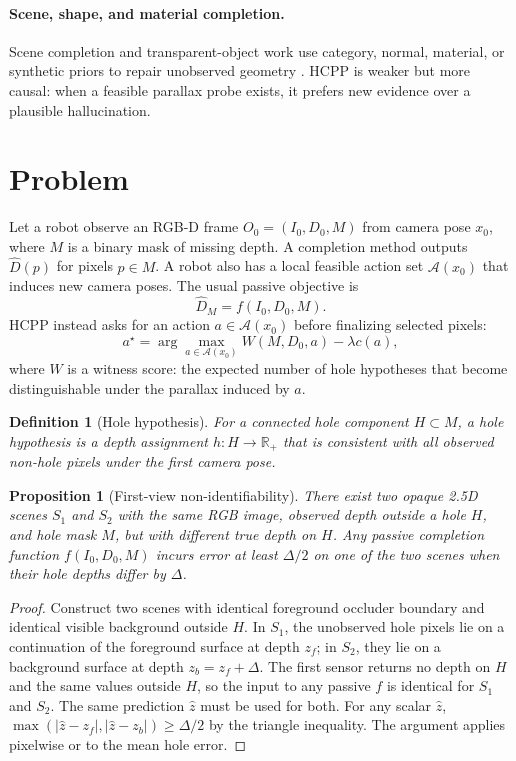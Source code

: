 \documentclass{article}
\newtheorem{proposition}{Proposition}
\newtheorem{definition}{Definition}
\begin{document}
\paragraph{Scene, shape, and material completion.}
Scene completion and transparent-object work use category, normal, material, or synthetic priors to repair unobserved geometry \citep{song2017sscnet,sajjan2019cleargrasp}. HCPP is weaker but more causal: when a feasible parallax probe exists, it prefers new evidence over a plausible hallucination.

\section{Problem}
Let a robot observe an RGB-D frame $O_0=(I_0,D_0,M)$ from camera pose $x_0$, where $M$ is a binary mask of missing depth. A completion method outputs $\hat{D}(p)$ for pixels $p\in M$. A robot also has a local feasible action set $\mathcal{A}(x_0)$ that induces new camera poses. The usual passive objective is
\begin{equation}
\hat{D}_M = f(I_0,D_0,M).
\end{equation}
HCPP instead asks for an action $a\in\mathcal{A}(x_0)$ before finalizing selected pixels:
\begin{equation}
a^\star = \arg\max_{a\in\mathcal{A}(x_0)} W(M,D_0,a) - \lambda c(a),
\end{equation}
where $W$ is a witness score: the expected number of hole hypotheses that become distinguishable under the parallax induced by $a$.

\begin{definition}[Hole hypothesis]
For a connected hole component $H\subset M$, a hole hypothesis is a depth assignment $h:H\rightarrow\mathbb{R}_+$ that is consistent with all observed non-hole pixels under the first camera pose.
\end{definition}

\begin{proposition}[First-view non-identifiability]
There exist two opaque 2.5D scenes $S_1$ and $S_2$ with the same RGB image, observed depth outside a hole $H$, and hole mask $M$, but with different true depth on $H$. Any passive completion function $f(I_0,D_0,M)$ incurs error at least $\Delta/2$ on one of the two scenes when their hole depths differ by $\Delta$.
\end{proposition}
\begin{proof}
Construct two scenes with identical foreground occluder boundary and identical visible background outside $H$. In $S_1$, the unobserved hole pixels lie on a continuation of the foreground surface at depth $z_f$; in $S_2$, they lie on a background surface at depth $z_b=z_f+\Delta$. The first sensor returns no depth on $H$ and the same values outside $H$, so the input to any passive $f$ is identical for $S_1$ and $S_2$. The same prediction $\hat{z}$ must be used for both. For any scalar $\hat{z}$, $\max(|\hat{z}-z_f|,|\hat{z}-z_b|)\geq \Delta/2$ by the triangle inequality. The argument applies pixelwise or to the mean hole error.
\end{proof}
\end{document}
